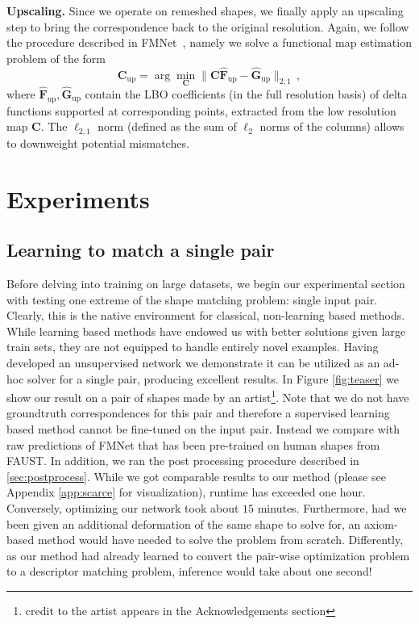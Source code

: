 \documentclass[10pt,twocolumn,letterpaper]{article}
\begin{document}
\vspace{1ex}\noindent\textbf{Upscaling.}
Since we operate on remeshed shapes, we finally apply an upscaling step to bring the correspondence back to the original resolution. Again, we follow the procedure described in FMNet~\cite{litany2017deep}, namely we solve a functional map estimation problem of the form
\begin{equation}
    \mathbf{C}_\mathrm{up} = \arg\min_\mathbf{C} \| \mathbf{C}\hat{\mathbf{F}}_\mathrm{up} - \hat{\mathbf{G}}_\mathrm{up}\|_{2,1}\,,
\end{equation}
where $\hat{\mathbf{F}}_\mathrm{up},\hat{\mathbf{G}}_\mathrm{up}$ contain the LBO coefficients (in the full resolution basis) of delta functions supported at corresponding points, extracted from the low resolution map $\mathbf{C}$. The $\ell_{2,1}$ norm (defined as the sum of $\ell_2$ norms of the columns) allows to downweight potential mismatches.

\section{Experiments}
\subsection{Learning to match a single pair}
\label{sec:zeroshot}
Before delving into training on large datasets, we begin our experimental section with testing one extreme of the shape matching problem: single input pair. Clearly, this is the native environment for classical, non-learning based methods. While learning based methods have endowed us with better solutions given large train sets, they are not equipped to handle entirely novel examples. Having developed an unsupervised network we demonstrate it can be utilized as an ad-hoc solver for a single pair, producing excellent results. In Figure \ref{fig:teaser} we show our result on a pair of shapes made by an artist\footnote{credit to the artist appears in the Acknowledgements section}. Note that we do not have groundtruth correspondences for this pair and therefore a supervised learning based method cannot be fine-tuned on the input pair. Instead we compare with raw predictions of FMNet that has been pre-trained on human shapes from FAUST. In addition, we ran the post processing procedure described in \ref{sec:postprocess}. While we got comparable results to our method (please see Appendix \ref{app:scarce} for visualization), runtime has exceeded one hour. Conversely, optimizing our network took about $15$ minutes. Furthermore, had we been given an additional deformation of the same shape to solve for, an axiom-based method would have needed to solve the problem from scratch. Differently, as our method had already learned to convert the pair-wise optimization problem to a descriptor matching problem, inference would take about one second!
\end{document}
